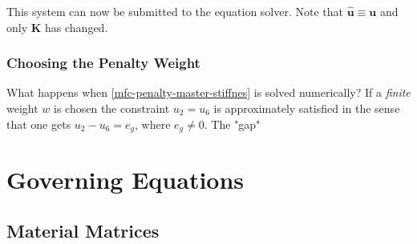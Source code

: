 \documentclass[10pt,b5paper,titlepage]{book}
\begin{document}
This system can now be submitted to the equation solver. Note that
$ \mathbf{\hat{u}} \equiv \mathbf{u} $ and only $ \mathbf{K} $ has changed.

\subsection{Choosing the Penalty Weight}

What happens when \eqref{mfc-penalty-master-stiffnes} is solved numerically?
If a \textit{finite} weight $ w $ is chosen the constraint $ u_2 = u_6 $ is
approximately satisfied in the sense that one gets $ u_2 - u_6 = e_g $, where
$ e_g \neq 0 $. The "gap"





\newpage
\chapter{Governing Equations}

\section{Material Matrices}
\end{document}
